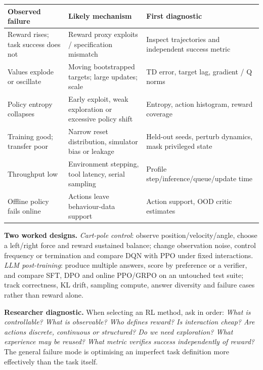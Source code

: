 \begin{center}\begingroup\footnotesize\setlength{\tabcolsep}{3pt}
\begin{tabular}{|p{.23\linewidth}|p{.38\linewidth}|p{.30\linewidth}|}\hline
\textbf{Observed failure} & \textbf{Likely mechanism} & \textbf{First diagnostic}\\ \hline
Reward rises; task success does not & Reward proxy exploits / specification mismatch & Inspect trajectories and independent success metric\\ \hline
Values explode or oscillate & Moving bootstrapped targets; large updates; scale & TD error, target lag, gradient / Q norms\\ \hline
Policy entropy collapses & Early exploit, weak exploration or excessive policy shift & Entropy, action histogram, reward coverage\\ \hline
Training good; transfer poor & Narrow reset distribution, simulator bias or leakage & Held-out seeds, perturb dynamics, mask privileged state\\ \hline
Throughput low & Environment stepping, tool latency, serial sampling & Profile step/inference/queue/update time\\ \hline
Offline policy fails online & Actions leave behaviour-data support & Action support, OOD critic estimates\\ \hline
\end{tabular}\endgroup\end{center}
\textbf{Two worked designs.} \emph{Cart-pole control}: observe position/velocity/angle, choose a left/right force and reward sustained balance; change observation noise, control frequency or termination and compare DQN with PPO under fixed interactions.
\emph{LLM post-training}: produce multiple answers, score by preference or a verifier, and compare SFT, DPO and online PPO/GRPO on an untouched test suite; track correctness, KL drift, sampling compute, answer diversity and failure cases rather than reward alone.

\textbf{Researcher diagnostic.} When selecting an RL method, ask in order: \emph{What is controllable? What is observable? Who defines reward? Is interaction cheap? Are actions discrete, continuous or structured? Do we need exploration? What experience may be reused? What metric verifies success independently of reward?}
The general failure mode is optimising an imperfect task definition more effectively than the task itself.

